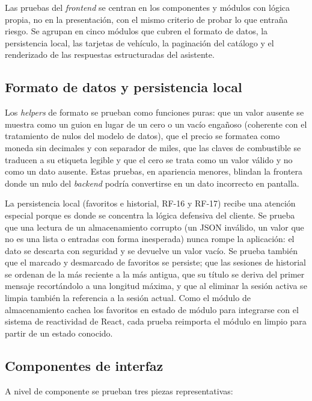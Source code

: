 Las pruebas del \emph{frontend} se centran en los componentes y módulos con
lógica propia, no en la presentación, con el mismo criterio de probar lo que
entraña riesgo. Se agrupan en cinco módulos que cubren el formato de datos, la
persistencia local, las tarjetas de vehículo, la paginación del catálogo y el
renderizado de las respuestas estructuradas del asistente.

\subsection{Formato de datos y persistencia local}
\label{sec:test-frontend-datos}

Los \emph{helpers} de formato se prueban como funciones puras: que un valor
ausente se muestra como un guion en lugar de un cero o un vacío engañoso
(coherente con el tratamiento de nulos del modelo de datos), que el precio se
formatea como moneda sin decimales y con separador de miles, que las claves de
combustible se traducen a su etiqueta legible y que el cero se trata como un valor
válido y no como un dato ausente. Estas pruebas, en apariencia menores, blindan la
frontera donde un nulo del \emph{backend} podría convertirse en un dato
incorrecto en pantalla.

La persistencia local (favoritos e historial, RF-16 y RF-17) recibe una atención
especial porque es donde se concentra la lógica defensiva del cliente. Se prueba
que una lectura de un almacenamiento corrupto (un JSON inválido, un
valor que no es una lista o entradas con forma inesperada) nunca rompe la
aplicación: el dato se descarta con seguridad y se devuelve un valor vacío. Se
prueba también que el marcado y desmarcado de favoritos se persiste; que las
sesiones
de historial se ordenan de la más reciente a la más antigua, que su título se
deriva del primer mensaje recortándolo a una longitud máxima, y que al eliminar
la sesión activa se limpia también la referencia a la sesión actual. Como el
módulo de almacenamiento cachea los favoritos en estado de módulo para integrarse
con el sistema de reactividad de React, cada prueba reimporta el módulo en limpio
para partir de un estado conocido.

\subsection{Componentes de interfaz}
\label{sec:test-frontend-componentes}

A nivel de componente se prueban tres piezas representativas:

